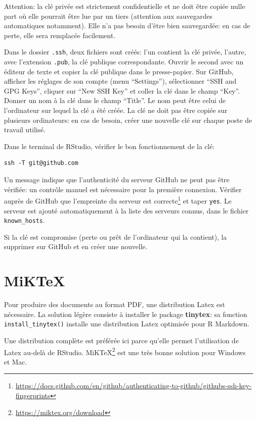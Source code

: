 \documentclass[
  12pt,
  french,
  a4paper,
  extrafontsizes,onecolumn,openright
  ]{memoir}
\begin{document}
Attention: la clé privée est strictement confidentielle et ne doit être copiée nulle part où elle pourrait être lue par un tiers (attention aux sauvegardes automatiques notamment).
Elle n'a pas besoin d'être bien sauvegardée: en cas de perte, elle sera remplacée facilement.

Dans le dossier \texttt{.ssh}, deux fichiers sont créés: l'un contient la clé privée, l'autre, avec l'extension \texttt{.pub}, la clé publique correspondante.
Ouvrir le second avec un éditeur de texte et copier la clé publique dans le presse-papier.
Sur GitHub, afficher les réglages de son compte (menu \enquote{Settings}), sélectionner \enquote{SSH and GPG Keys}, cliquer sur \enquote{New SSH Key} et coller la clé dans le champ \enquote{Key}.
Donner un nom à la clé dans le champ \enquote{Title}.
Le nom peut être celui de l'ordinateur sur lequel la clé a été créée.
La clé ne doit pas être copiée sur plusieurs ordinateurs: en cas de besoin, créer une nouvelle clé sur chaque poste de travail utilisé.

Dans le terminal de RStudio, vérifier le bon fonctionnement de la clé:

\begin{verbatim}
ssh -T git@github.com
\end{verbatim}

Un message indique que l'authenticité du serveur GitHub ne peut pas être vérifiée: un contrôle manuel est nécessaire pour la première connexion.
Vérifier auprès de GitHub que l'empreinte du serveur est correcte\footnote{\url{https://docs.github.com/en/github/authenticating-to-github/githubs-ssh-key-fingerprints}} et taper \texttt{yes}.
Le serveur est ajouté automatiquement à la liste des serveurs connus, dans le fichier \texttt{known\_hosts}.

Si la clé est compromise (perte ou prêt de l'ordinateur qui la contient), la supprimer sur GitHub et en créer une nouvelle.

\hypertarget{miktex}{%
\section{MiKTeX}\label{miktex}}

Pour produire des documents au format PDF, une distribution Latex est nécessaire.
La solution légère consiste à installer le package \textbf{tinytex}: sa fonction \texttt{install\_tinytex()} installe une distribution Latex optimisée pour R Markdown.

Une distribution complète est préférée ici parce qu'elle permet l'utilisation de Latex au-delà de RStudio.
MiKTeX\footnote{\url{https://miktex.org/download}} est une très bonne solution pour Windows et Mac.
\end{document}
